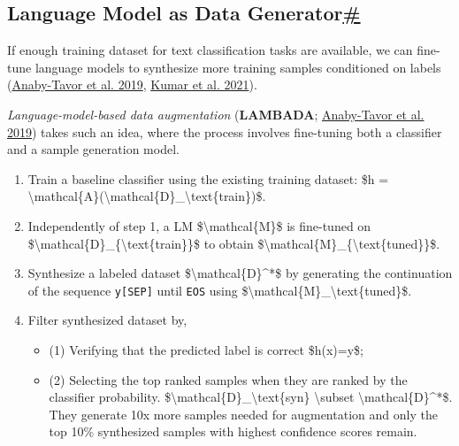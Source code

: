 \subsection{\texorpdfstring{Language Model as Data Generator\hyperref[language-model-as-data-generator]{\#}}{Language Model as Data Generator\#}}\label{language-model-as-data-generator}

If enough training dataset for text classification tasks are available, we can fine-tune language models to synthesize more training samples conditioned on labels (\href{https://arxiv.org/abs/1911.03118}{Anaby-Tavor et al. 2019}, \href{https://arxiv.org/abs/2003.02245}{Kumar et al. 2021}).

\emph{Language-model-based data augmentation} (\textbf{LAMBADA}; \href{https://arxiv.org/abs/1911.03118}{Anaby-Tavor et al. 2019}) takes such an idea, where the process involves fine-tuning both a classifier and a sample generation model.

\begin{enumerate}
\tightlist
\item
  Train a baseline classifier using the existing training dataset: \$h = \textbackslash mathcal\{A\}(\textbackslash mathcal\{D\}\_\textbackslash text\{train\})\$.
\item
  \label{step2}{}Independently of step 1, a LM \$\textbackslash mathcal\{M\}\$ is fine-tuned on \$\textbackslash mathcal\{D\}\_\{\textbackslash text\{train\}\}\$ to obtain \$\textbackslash mathcal\{M\}\_\{\textbackslash text\{tuned\}\}\$.
\item
  Synthesize a labeled dataset \$\textbackslash mathcal\{D\}\^{}*\$ by generating the continuation of the sequence \texttt{y{[}SEP{]}} until \texttt{EOS} using \$\textbackslash mathcal\{M\}\_\textbackslash text\{tuned\}\$.
\item
  Filter synthesized dataset by,

  \begin{itemize}
  \tightlist
  \item
    (1) Verifying that the predicted label is correct \$h(x)=y\$;
  \item
    (2) Selecting the top ranked samples when they are ranked by the classifier probability. \$\textbackslash mathcal\{D\}\_\textbackslash text\{syn\} \textbackslash subset \textbackslash mathcal\{D\}\^{}*\$. They generate 10x more samples needed for augmentation and only the top 10\% synthesized samples with highest confidence scores remain.
  \end{itemize}
\end{enumerate}

